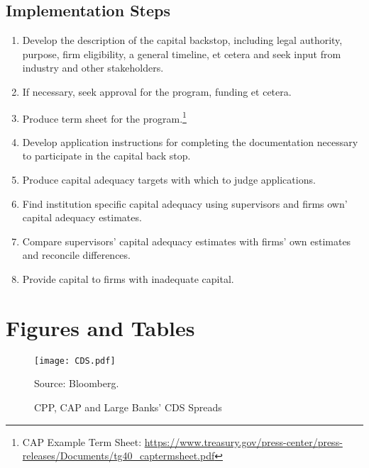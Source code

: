 \documentclass[12pt]{article}
\begin{document}
\subsection{Implementation Steps}

\begin{enumerate}

\item Develop the description of the capital backstop, including legal authority, purpose, firm eligibility, a general timeline, et cetera and seek input from industry and other stakeholders.
\item If necessary, seek approval for the program, funding et cetera.
\item Produce term sheet for the program.\footnote{CAP Example Term Sheet: \newline \url{https://www.treasury.gov/press-center/press-releases/Documents/tg40_captermsheet.pdf}}
\item Develop application instructions for completing the documentation necessary to participate in the capital back stop.
\item Produce capital adequacy targets with which to judge applications.
\item Find institution specific capital adequacy using supervisors and firms own' capital adequacy estimates.
\item Compare supervisors' capital adequacy estimates with firms' own estimates and reconcile differences.
\item Provide capital to firms with inadequate capital.

\end{enumerate}

\newpage
\section{Figures and Tables}

\begin{figure}[h]
\caption{CPP, CAP and Large Banks' CDS Spreads}\label{figure1}
\centering
\texttt{[image: CDS.pdf]}
\raggedright
\footnotesize Source: Bloomberg.
\end{figure}
\end{document}
